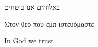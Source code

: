 \documentclass{minimal}
\author{Hélio Giroto}
\begin{document}
באלוהים אנו בוטחים

\begin{greek}
  Στον θεό που εμπ ιστευόμαστε
\end{greek}


In God we trust
\end{document}
